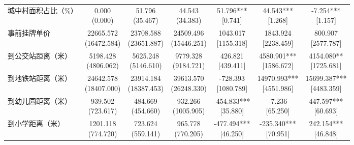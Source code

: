 \documentclass[a4paper,12pt]{report}
\begin{document}
\begin{table}[H]
\begin{adjustbox}{width=\textwidth,center}
\begin{tabular}{lcccccc}
城中村面积占比（\%） & \makecell{0.000\\(0.000)} & \makecell{51.796\\(35.467)} & \makecell{44.543\\(34.383)} & \makecell{51.796***\\ {[0.741]}} & \makecell{44.543***\\ {[1.268]}} & \makecell{-7.254***\\ {[1.157]}} \\
事前挂牌单价 & \makecell{22665.572\\(16472.584)} & \makecell{23708.588\\(23651.887)} & \makecell{24509.496\\(15446.251)} & \makecell{1043.017\\ {[1155.318]}} & \makecell{1843.924\\ {[2238.459]}} & \makecell{800.907\\ {[2577.787]}} \\
到公交站距离（米） & \makecell{5198.428\\(4806.062)} & \makecell{5625.248\\(5146.610)} & \makecell{9779.328\\(9184.721)} & \makecell{426.821\\ {[439.411]}} & \makecell{4580.901***\\ {[1586.672]}} & \makecell{4154.080**\\ {[1725.681]}} \\
到地铁站距离（米） & \makecell{24642.578\\(18407.000)} & \makecell{23914.184\\(18387.453)} & \makecell{39613.570\\(26248.330)} & \makecell{-728.393\\ {[1080.789]}} & \makecell{14970.993***\\ {[4551.986]}} & \makecell{15699.387***\\ {[4483.359]}} \\
到幼儿园距离（米） & \makecell{939.502\\(723.617)} & \makecell{484.669\\(454.660)} & \makecell{932.266\\(1005.905)} & \makecell{-454.833***\\ {[35.880]}} & \makecell{-7.236\\ {[65.250]}} & \makecell{447.597***\\ {[60.693]}} \\
到小学距离（米） & \makecell{1201.118\\(774.720)} & \makecell{723.624\\(559.141)} & \makecell{965.778\\(770.205)} & \makecell{-477.494***\\ {[46.250]}} & \makecell{-235.340***\\ {[70.951]}} & \makecell{242.154***\\ {[46.848]}} \\

\end{tabular}
\end{adjustbox}
\end{table}
\end{document}
